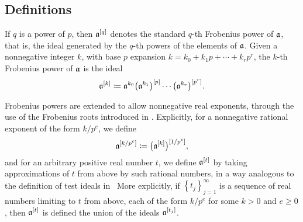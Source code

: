 \documentclass[11pt]{amsart}
\begin{document}

\subsection{Definitions} \label{frobenius powers definitions: S}

{

If $q$ is a power of $p$, then $\mathfrak{a}^{[q]}$ denotes the standard $q$-th Frobenius power of $\mathfrak{a}$, that is, the ideal generated by the $q$-th powers of the elements of $\mathfrak{a}$.
Given a nonnegative integer $k$, with base $p$ expansion $k = k_0 + k_1 p + \cdots + k_r p^r$, the $k$-th Frobenius power of $\mathfrak{a}$ is the ideal
\[\mathfrak{a}^{[k]} \coloneqq \mathfrak{a}^{k_0}\big(\mathfrak{a}^{k_1}\big)^{[p]}\cdots \big(\mathfrak{a}^{k_r}\big)^{[p^r]}.\]




Frobenius powers are extended to allow nonnegative real exponents, through the use of the Frobenius roots introduced in \cite{blickle+mustata+smith.discr_rat_FPTs}.
Explicitly, for a nonnegative rational exponent of the form $k/p^e$, we define
\[\mathfrak{a}^{[k/p^e]} \coloneqq \big(\mathfrak{a}^{[k]}\big)^{[1/p^e]},\]
and for an arbitrary positive real number $t$, we define $\mathfrak{a}^{[t]}$ by taking approximations of $t$ from above by such rational numbers, in a way analogous to the definition of test ideals in \loccit\
More explicitly, if $\left\{t_j\right\}_{j=1}^\infty$ is a sequence of real numbers limiting to $t$ from above, each of the form $k/p^e$ for some $k>0$ and $e \geq 0$, then $\mathfrak{a}^{[t]}$ is defined the union of the ideals $\mathfrak{a}^{[t_j]}$.

}
\end{document}
